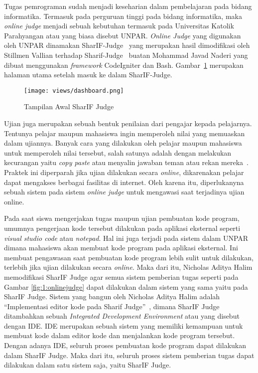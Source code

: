 Tugas pemrograman sudah menjadi keseharian dalam pembelajaran pada bidang informatika.
Termasuk pada perguruan tinggi pada bidang informatika, maka \textit{online judge} menjadi sebuah kebutuhan termasuk pada Universitas Katolik Parahyangan atau yang biasa disebut UNPAR.
\textit{Online Judge} yang digunakan oleh UNPAR dinamakan SharIF-Judge~\cite{stillmen:sharif} yang merupakan hasil dimodifikasi oleh Stillmen Vallian terhadap Sharif-Judge~\cite{javed:sharif} buatan Mohammad Javad Naderi yang dibuat menggunakan \textit{framework} CodeIgniter dan Bash. Gambar~\ref{fig:1:dashboardpng} merupakan halaman utama setelah masuk ke dalam SharIF-Judge.

\begin{figure}[H]
    \centering
    \texttt{[image: views/dashboard.png]}
    \caption[Tampilan Awal SharIF Judge]{Tampilan Awal SharIF Judge}
    \label{fig:1:dashboardpng}
\end{figure}

Ujian juga merupakan sebuah bentuk penilaian dari pengajar kepada pelajarnya. Tentunya pelajar maupun mahasiswa ingin memperoleh nilai yang memuaskan dalam ujiannya. Banyak cara yang dilakukan oleh pelajar maupun mahasiswa untuk memperoleh nilai tersebut, salah satunya adalah dengan melakukan kecurangan yaitu \textit{copy paste} atau menyalin jawaban teman atau rekan mereka~\cite{febriana:plagiarisme}. Praktek ini diperparah jika ujian dilakukan secara \textit{online}, dikarenakan pelajar dapat mengakses berbagai fasilitas di internet. Oleh karena itu, diperlukanyna sebuah sistem pada sistem \textit{online judge} untuk mengawasi saat terjadinya ujian online.

Pada saat siswa mengerjakan tugas maupun ujian pembuatan kode program, umumnya pengerjaan kode tersebut dilakukan pada aplikasi eksternal seperti \textit{visual studio code} atau \textit{notepad}. Hal ini juga terjadi pada sistem dalam UNPAR dimana mahasiswa akan membuat kode program pada aplikasi eksternal. Ini membuat pengawasan saat pembuatan kode program lebih sulit untuk dilakukan, terlebih jika ujian dilakukan secara \textit{online}. Maka dari itu, Nicholas Aditya Halim memodifikasi SharIF Judge agar semua sistem pemberian tugas seperti pada Gambar \ref{fig:1:onlinejudge} dapat dilakukan dalam sistem yang sama yaitu pada SharIF Judge. Sistem yang bangun oleh Nicholas Aditya Halim adalah ``Implementasi editor kode pada Sharif Judge''~\cite{nicholas:sharif}, dimana SharIF Judge ditambahkan sebuah \textit{Integrated Development Environment} atau yang disebut dengan IDE. IDE merupakan sebuah sistem yang memiliki kemampuan untuk membuat kode dalam editor kode dan menjalankan kode program tersebut. Dengan adanya IDE, seluruh proses pembuatan kode program dapat dilakukan dalam SharIF Judge. Maka dari itu, seluruh proses sistem pemberian tugas dapat dilakukan dalam satu sistem saja, yaitu SharIF Judge.

